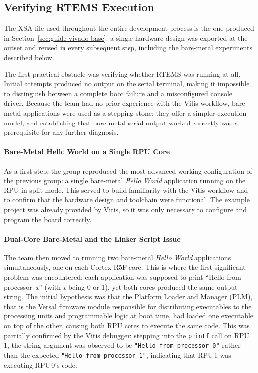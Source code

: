 \documentclass[
	a4paper,
]{CSMakotoTechnicalReport}
\begin{document}

\subsection{Verifying RTEMS Execution}
\label{sec:process-rtems}

The XSA file used throughout the entire development process is the one produced in Section~\ref{sec:guide-vivado-base}: a single hardware design was exported at the outset and reused in every subsequent step, including the bare-metal experiments described below.

The first practical obstacle was verifying whether RTEMS was running at all.
Initial attempts produced no output on the serial terminal, making it impossible to distinguish between a complete boot failure and a misconfigured console driver.
Because the team had no prior experience with the Vitis workflow, bare-metal applications were used as a stepping stone: they offer a simpler execution model, and establishing that bare-metal serial output worked correctly was a prerequisite for any further diagnosis.

\paragraph*{Bare-Metal Hello World on a Single RPU Core}

As a first step, the group reproduced the most advanced working configuration of the previous group: a single bare-metal \textit{Hello World} application running on the RPU in split mode.
This served to build familiarity with the Vitis workflow and to confirm that the hardware design and toolchain were functional.
The example project was already provided by Vitis, so it was only necessary to configure and program the board correctly.

\paragraph*{Dual-Core Bare-Metal and the Linker Script Issue}

The team then moved to running two bare-metal \textit{Hello World} applications simultaneously, one on each Cortex-R5F core.
This is where the first significant problem was encountered: each application was supposed to print ``Hello from processor~\textit{x}'' (with \textit{x} being 0 or 1), yet both cores produced the same output string.
The initial hypothesis was that the Platform Loader and Manager (PLM), that is the Versal firmware module responsible for distributing executables to the processing units and programmable logic at boot time, had loaded one executable on top of the other, causing both RPU cores to execute the same code.
This was partially confirmed by the Vitis debugger: stepping into the \texttt{printf} call on RPU\,1, the string argument was observed to be \texttt{"Hello from processor 0"} rather than the expected \texttt{"Hello from processor 1"}, indicating that RPU\,1 was executing RPU\,0's code.
\end{document}
